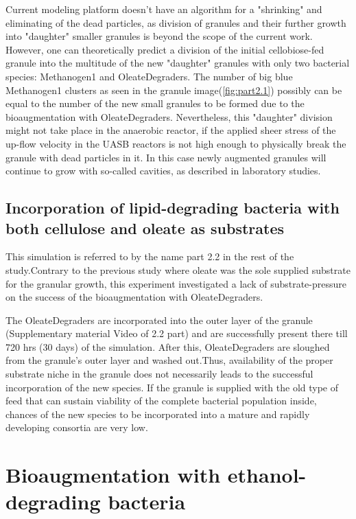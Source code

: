 Current modeling platform doesn't have an algorithm for a "shrinking" and eliminating of the dead particles, as division of granules and their further growth into "daughter" smaller granules is beyond the scope of the current work. However, one can theoretically predict a division of the initial cellobiose-fed granule into the multitude of the new "daughter" granules with only two bacterial species: Methanogen1 and OleateDegraders. The number of big blue Methanogen1 clusters as seen in the granule image(\ref{fig:part2.1}) possibly can be equal to the number of the new small granules to be formed due to the bioaugmentation with OleateDegraders. Nevertheless, this "daughter" division might not take place in the anaerobic reactor, if the applied sheer stress of the up-flow velocity in the UASB reactors is not high enough to physically break the granule with dead particles in it. In this case newly augmented granules will continue to grow with so-called cavities, as described in laboratory studies. 

\subsection{Incorporation of lipid-degrading bacteria with both cellulose and oleate as substrates}

This simulation is referred to by the name part 2.2 in the rest of the study.Contrary to the previous study where oleate was the sole supplied substrate for the granular growth, this experiment investigated a lack of substrate-pressure on the success of the bioaugmentation with OleateDegraders.

The OleateDegraders are incorporated into the outer layer of the granule (Supplementary material Video of 2.2 part) and are successfully present there till 720 hrs (30 days) of the simulation. After this, OleateDegraders are sloughed from the granule's outer layer and washed out.Thus, availability of the proper substrate niche in the granule does not necessarily leads to the successful incorporation of the new species. If the granule is supplied with the old type of feed that can sustain viability of the complete bacterial population inside, chances of the new species to be incorporated into a mature and rapidly developing consortia are very low.  

\section{Bioaugmentation with ethanol-degrading bacteria}

